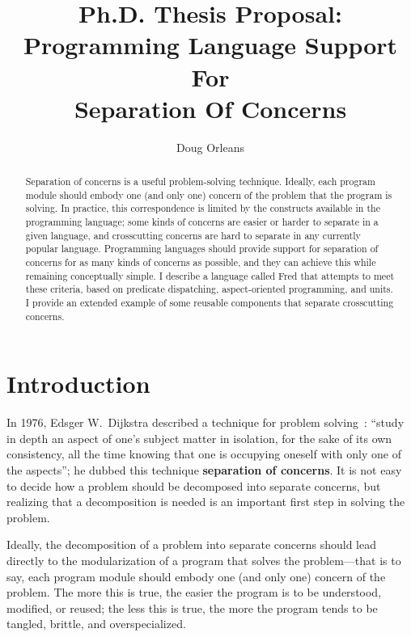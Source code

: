 \documentclass{article}
\title{Ph.D. Thesis Proposal: \\
Programming Language Support For\\
Separation Of Concerns}
\author{Doug Orleans}
\newcommand{\defn}[1]{\textbf{#1}}
\begin{document}

\maketitle



\begin{abstract}
\noindent
Separation of concerns is a useful problem-solving technique.
Ideally, each program module should embody one (and only one) concern
of the problem that the program is solving.  In practice, this
correspondence is limited by the constructs available in the
programming language; some kinds of concerns are easier or harder to
separate in a given language, and crosscutting concerns are hard to
separate in any currently popular language.  Programming languages
should provide support for separation of concerns for as many kinds of
concerns as possible, and they can achieve this while remaining
conceptually simple.  I describe a language called Fred that attempts
to meet these criteria, based on predicate dispatching,
aspect-oriented programming, and units.  I provide an extended example
of some reusable components that separate crosscutting concerns.
\end{abstract}

\section{Introduction}
\label{introduction}

In 1976, Edsger W.~Dijkstra described a technique for problem
solving~\cite[page 211]{dijkstra-SOC}: ``study in depth an aspect of
one's subject matter in isolation, for the sake of its own
consistency, all the time knowing that one is occupying oneself with
only one of the aspects''; he dubbed this technique \defn{separation
of concerns}.  It is not easy to decide how a problem should be
decomposed into separate concerns, but realizing that a decomposition
is needed is an important first step in solving the problem.

Ideally, the decomposition of a problem into separate concerns should
lead directly to the modularization of a program that solves the
problem---that is to say, each program module should embody one (and
only one) concern of the problem.  The more this is true, the easier
the program is to be understood, modified, or reused; the less this is 
true, the more the program tends to be tangled, brittle, and
overspecialized.
\end{document}

